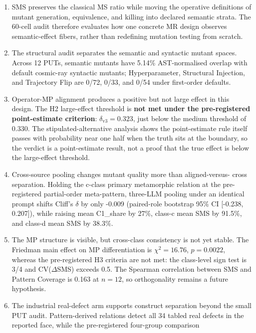 \documentclass[manuscript,screen,review]{acmart}
\begin{document}
\begin{enumerate}
\item
  SMS preserves the classical MS ratio while moving the operative
  definitions of mutant generation, equivalence, and killing into
  declared semantic strata. The 60-cell audit therefore evaluates how
  one concrete MR design observes semantic-effect fibers, rather than
  redefining mutation testing from scratch.
\item
  The structural audit separates the semantic and syntactic mutant
  spaces. Across 12 PUTs, semantic mutants have 5.14\% AST-normalised
  overlap with default cosmic-ray syntactic mutants; Hyperparameter,
  Structural Injection, and Trajectory Flip are 0/72, 0/33, and 0/54
  under first-order defaults.
\item
  Operator-MP alignment produces a positive but not large effect in this
  design. The H2 large-effect threshold is \textbf{not met under the
  pre-registered point-estimate criterion}: \(\delta_{\mathrm{v3}} =
  0.323\), just below the \citet{romano2006cliff} medium threshold of
  0.330. The stipulated-alternative analysis shows the point-estimate rule
  itself passes with probability near one half when the truth sits at
  the boundary, so the verdict is a point-estimate result, not a proof
  that the true effect is below the large-effect threshold.
\item
  Cross-source pooling changes mutant quality more than aligned-versus-
  cross separation. Holding the c-class primary metamorphic relation at
  the pre-registered partial-order meta-pattern, three-LLM pooling under
  an identical prompt
  shifts Cliff's \(\delta\) by only -0.009 (paired-role bootstrap 95\%
  CI {[}-0.238, 0.207{]}), while
  raising mean C1\_share by 27\%, class-c mean SMS by 91.5\%, and
  class-d mean SMS by 38.3\%.
\item
  The MP structure is visible, but cross-class consistency is not yet
  stable. The Friedman main effect on MP differentiation is
  \(\chi^2 = 16.76\), \(p = 0.0022\), whereas the pre-registered H3
  criteria are not met: the class-level sign test is 3/4 and
  CV(\(\Delta\)SMS) exceeds 0.5. The Spearman correlation between SMS
  and Pattern Coverage is 0.163 at \(n = 12\), so orthogonality remains
  a future hypothesis.
\item
  The industrial real-defect arm supports construct separation beyond
  the small PUT audit. Pattern-derived relations detect all 34 tabled
  real defects
  in the reported face, while the pre-registered four-group comparison

\end{enumerate}
\end{document}
